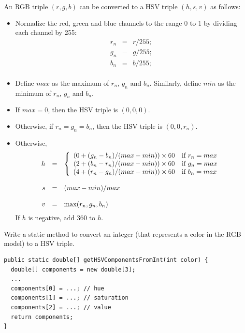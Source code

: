 \documentclass{book}
\begin{document}
An RGB triple $(r, g, b)$ can be converted to a HSV triple $(h, s, v)$ as follows:
\begin{itemize}
  \item Normalize the red, green and blue channels to the range 0 to 1 by dividing each channel by 255:
  $$\begin{array}{rcl}
  r_n & = & r / 255;\\
  g_n & = & g / 255;\\
  b_n & = & b / 255;\\
  \end{array}$$
  \item Define ${max}$ as the maximum of $r_n$, $g_n$ and $b_n$. Similarly, define ${min}$ as the minimum of $r_n$, $g_n$ and $b_n$. 
  \item If ${max} = 0$, then the HSV triple is $(0, 0, 0)$.
  \item Otherwise, if $r_n=g_n=b_n$, then the HSV triple is $(0, 0, r_n)$.
  \item Otherwise,
  $$\begin{array}{rcl}
  h & = & \left\{\begin{array}{c l}
  (0 + (g_n - b_n) / ({max} - {min})) \times 60 & \text{if $r_n= {max}$}\\
  (2 + (b_n - r_n) / ({max} - {min})) \times 60 & \text{if $g_n = {max}$}\\
 (4 + (r_n - g_n) / ({max} - {min})) \times 60 & \text{if $b_n = {max}$}\\
\end{array}
\right.\\
  & &\\ 
  s & = & ({max} - {min}) / max\\ 
  & &\\
  v & = & \max(r_n, g_n, b_n)\\
  \end{array}$$
If $h$ is negative, add $360$ to $h$.
\end{itemize}

\begin{exercise}
Write a static method  to convert an integer (that represents a color in the RGB model) to a HSV triple.
\begin{lstlisting}
public static double[] getHSVComponentsFromInt(int color) {
  double[] components = new double[3];
  ...
  components[0] = ...; // hue
  components[1] = ...; // saturation
  components[2] = ...; // value
  return components;
}
\end{lstlisting}
\end{exercise}
\end{document}
